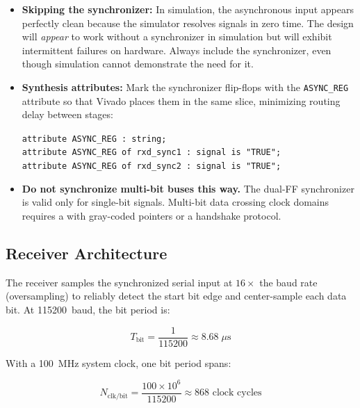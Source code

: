 \documentclass[11pt,letterpaper]{article}
\begin{document}
	\begin{tcolorbox}[warning={Common Pitfalls}]
		\begin{itemize}
			\item \textbf{Skipping the synchronizer:} In simulation, the asynchronous input appears perfectly clean because the simulator resolves signals in zero time. The design will \emph{appear} to work without a synchronizer in simulation but will exhibit intermittent failures on hardware. Always include the synchronizer, even though simulation cannot demonstrate the need for it.
			\item \textbf{Synthesis attributes:} Mark the synchronizer flip-flops with the \texttt{ASYNC\_REG} attribute so that Vivado places them in the same slice, minimizing routing delay between stages:
			\begin{center}
				\texttt{attribute ASYNC\_REG : string;}\\
				\texttt{attribute ASYNC\_REG of rxd\_sync1 : signal is "TRUE";}\\
				\texttt{attribute ASYNC\_REG of rxd\_sync2 : signal is "TRUE";}
			\end{center}
			\item \textbf{Do not synchronize multi-bit buses this way.} The dual-FF synchronizer is valid only for single-bit signals. Multi-bit data crossing clock domains requires a \FIFO{} with gray-coded pointers or a handshake protocol.
		\end{itemize}
	\end{tcolorbox}

	\subsection{\UART{} Receiver Architecture}

	The \UART{} receiver samples the synchronized serial input at $16\times$ the baud rate (oversampling) to reliably detect the start bit edge and center-sample each data bit. At 115200~baud, the bit period is:

	\begin{equation}
		T_{\text{bit}} = \frac{1}{115200} \approx 8.68\;\mu\text{s}
	\end{equation}

	With a 100~MHz system clock, one bit period spans:

	\begin{equation}
		N_{\text{clk/bit}} = \frac{100 \times 10^6}{115200} \approx 868 \text{ clock cycles}
	\end{equation}
\end{document}
